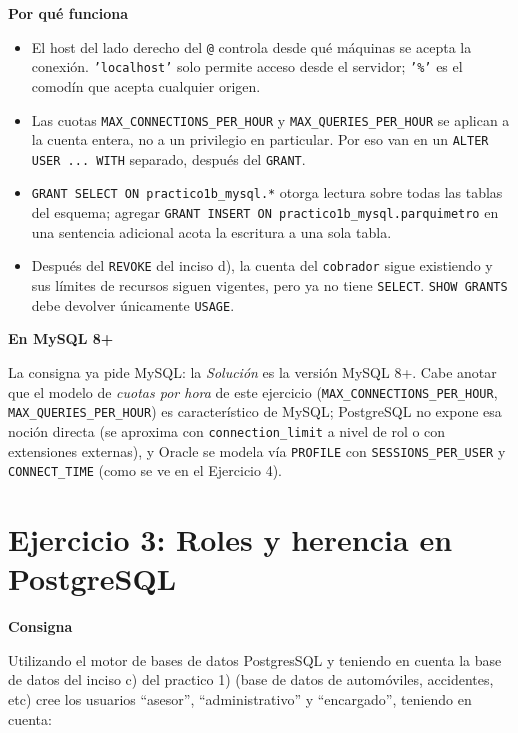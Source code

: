 \documentclass[11pt,a4paper]{article}
\newcommand{\itemcabecera}[1]{\noindent\textbf{#1}\par\medskip}
\newcommand{\bloqueConsigna}{\itemcabecera{Consigna}}
\newcommand{\bloquePorque}{\itemcabecera{Por qu\'e funciona}}
\newcommand{\bloqueMySQL}{\itemcabecera{En MySQL 8+}}
\begin{document}
\bloquePorque

\begin{itemize}
    \item El host del lado derecho del \texttt{@} controla desde qué máquinas se acepta la conexión. \texttt{'localhost'} solo permite acceso desde el servidor; \texttt{'\%'} es el comodín que acepta cualquier origen.
    \item Las cuotas \texttt{MAX\_CONNECTIONS\_PER\_HOUR} y \texttt{MAX\_QUERIES\_PER\_HOUR} se aplican a la cuenta entera, no a un privilegio en particular. Por eso van en un \texttt{ALTER USER ... WITH} separado, después del \texttt{GRANT}.
    \item \texttt{GRANT SELECT ON practico1b\_mysql.*} otorga lectura sobre todas las tablas del esquema; agregar \texttt{GRANT INSERT ON practico1b\_mysql.parquimetro} en una sentencia adicional acota la escritura a una sola tabla.
    \item Después del \texttt{REVOKE} del inciso d), la cuenta del \texttt{cobrador} sigue existiendo y sus límites de recursos siguen vigentes, pero ya no tiene \texttt{SELECT}. \texttt{SHOW GRANTS} debe devolver únicamente \texttt{USAGE}.
\end{itemize}

\bloqueMySQL

La consigna ya pide MySQL: la \textit{Solución} es la versión MySQL 8+. Cabe anotar que el modelo de \emph{cuotas por hora} de este ejercicio (\texttt{MAX\_CONNECTIONS\_PER\_HOUR}, \texttt{MAX\_QUERIES\_PER\_HOUR}) es característico de MySQL; PostgreSQL no expone esa noción directa (se aproxima con \texttt{connection\_limit} a nivel de rol o con extensiones externas), y Oracle se modela vía \texttt{PROFILE} con \texttt{SESSIONS\_PER\_USER} y \texttt{CONNECT\_TIME} (como se ve en el Ejercicio 4).

\section{Ejercicio 3: Roles y herencia en PostgreSQL}

\bloqueConsigna

Utilizando el motor de bases de datos PostgresSQL y teniendo en cuenta la base de datos del inciso c) del practico 1) (base de datos de automóviles, accidentes, etc) cree los usuarios ``asesor'', ``administrativo'' y ``encargado'', teniendo en cuenta:
\end{document}
